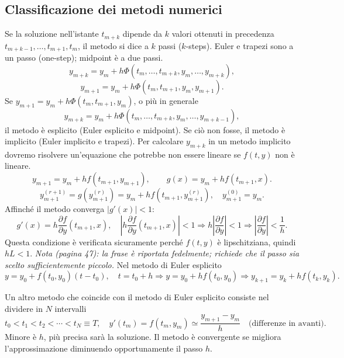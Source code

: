 \subsection*{Classificazione dei metodi numerici}
Se la soluzione nell'istante $t_{m+k}$ dipende da $k$ valori ottenuti in precedenza $t_{m+k-1},\ldots,t_{m+1},t_m$, il metodo si dice a $k$ passi ($k$-steps). Euler e trapezi sono a un passo (one-step); midpoint è a due passi.
\[y_{m+k}=y_m+h\Phi(t_m,\ldots,t_{m+k},y_m,\ldots,y_{m+k}),\]
\[y_{m+1}=y_m+h\Phi(t_m,t_{m+1},y_m,y_{m+1}).\]
Se $y_{m+1}=y_m+h\Phi(t_m,t_{m+1},y_m)$, o più in generale
\[y_{m+k}=y_m+h\Phi(t_m,\ldots,t_{m+k},y_m,\ldots,y_{m+k-1}),\]
il metodo è esplicito (Euler esplicito e midpoint).
Se ciò non fosse, il metodo è implicito (Euler implicito e trapezi). Per calcolare $y_{m+k}$ in un metodo implicito dovremo risolvere un'equazione che potrebbe non essere lineare se $f(t,y)$ non è lineare.
\[y_{m+1}=y_m+hf(t_{m+1},y_{m+1}),\qquad g(x)=y_m+hf(t_{m+1},x).\]
\[\boxed{y_{m+1}^{(r+1)}=g(y_{m+1}^{(r)})=y_m+hf(t_{m+1},y_{m+1}^{(r)})},\quad y_{m+1}^{(0)}=y_m.\]
Affinché il metodo converga $|g'(x)|<1$:
\[g'(x)=h\frac{\partial f}{\partial y}(t_{m+1},x),\quad\left|h\frac{\partial f}{\partial y}(t_{m+1},x)\right|<1\Longrightarrow h\left|\frac{\partial f}{\partial y}\right|<1\Longrightarrow\left|\frac{\partial f}{\partial y}\right|<\frac1h.\]
Questa condizione è verificata sicuramente perché $f(t,y)$ è lipschitziana, quindi $hL<1$.
\textit{Nota (pagina 47): la frase è riportata fedelmente; richiede che il passo sia scelto sufficientemente piccolo.}
Nel metodo di Euler esplicito
\[y=y_0+f(t_0,y_0)(t-t_0),\quad t=t_0+h\Longrightarrow y=y_0+hf(t_0,y_0)\Longrightarrow y_{k+1}=y_k+hf(t_k,y_k).\]
\begin{center}\end{center}
Un altro metodo che coincide con il metodo di Euler esplicito consiste nel dividere in $N$ intervalli
\[t_0<t_1<t_2<\cdots<t_N\equiv T,\quad y'(t_m)=f(t_m,y_m)\simeq\frac{y_{m+1}-y_m}h\quad\text{(differenze in avanti)}.\]
Minore è $h$, più precisa sarà la soluzione. Il metodo è convergente se migliora l'approssimazione diminuendo opportunamente il passo $h$.
